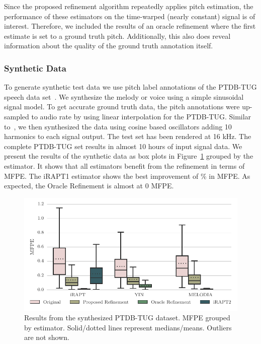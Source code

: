 Since the proposed refinement algorithm repeatedly applies pitch estimation, the performance of these estimators on the time-warped (nearly constant) signal is of interest. Therefore, we included the results of an oracle refinement where the first estimate is set to a ground truth pitch. Additionally, this also does reveal information about the quality of the ground truth annotation itself.

\subsubsection{Synthetic Data} %
\label{ssub:sythetic_data}

To generate synthetic test data we use pitch label annotations of the PTDB-TUG speech data set~\cite{pirker11}. We synthesize the melody or voice using a simple sinusoidal signal model. To get accurate ground truth data, the pitch annotations were up-sampled to audio rate by using linear interpolation for the PTDB-TUG. Similar to~\cite{mauch14}, we then synthesized the data using cosine based oscillators adding 10 harmonics to each signal output.
The test set has been rendered at 16 kHz. The complete PTDB-TUG set results in almost 10 hours of input signal data.
We present the results of the synthetic data as box plots in Figure~\ref{fig:ptdbtug_synth} grouped by the estimator. It shows that all estimators benefit from the refinement in terms of MFPE. The iRAPT1 estimator shows the best improvement of \ptdbtugsynthiRAPTIMPROMFPE \% in MFPE. As expected, the Oracle Refinement is almost at 0 MFPE.

\begin{figure}[t!]
\centering
        \includegraphics[width=0.90\columnwidth]{Chapters/05_Separation_Known/figures/stats_boxplot_ptdb_synth.pdf}
\caption{Results from the synthesized PTDB-TUG dataset. MFPE grouped by estimator. Solid/dotted lines represent medians/means. Outliers are not shown.}
\label{fig:ptdbtug_synth}
\end{figure}

